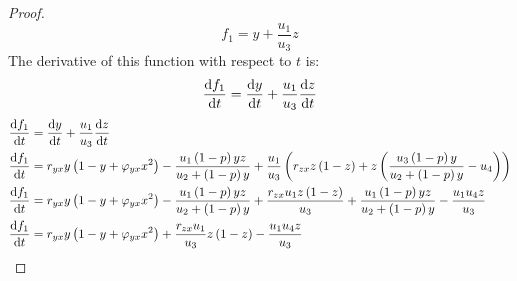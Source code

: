\begin{proof}
    \begin{equation*}
        f_1 = y + \frac{u_1}{u_3}z
    \end{equation*}
    The derivative of this function with respect to $t$ is:
    \begin{equation*}
        \diff[]{f_1}{t} = \diff[]{y}{t} + \frac{u_1}{u_3}\diff[]{z}{t}
    \end{equation*}
    \begin{align*}
        \diff[]{f_1}{t} &= \diff[]{y}{t} + \frac{u_1}{u_3}\diff[]{z}{t}\\
        \diff[]{f_1}{t} &= r_{yx}y\left(1-y+\varphi_{yx}x^2\right)-\frac{u_1\left(1-p\right)yz}{u_2+\left(1-p\right)y}+\frac{u_1}{u_3}\left(r_{zx}z\left(1-z\right)+z\left(\frac{u_3\left(1-p\right)y}{u_2+\left(1-p\right)y}-u_4\right)\right)\\
        \diff[]{f_1}{t} &= r_{yx}y\left(1-y+\varphi_{yx}x^2\right)-\frac{u_1\left(1-p\right)yz}{u_2+\left(1-p\right)y}+\frac{r_{zx}u_1z\left(1-z\right)}{u_3}+\frac{u_1\left(1-p\right)yz}{u_2+\left(1-p\right)y}-\frac{u_1u_4z}{u_3}\\
        \diff[]{f_1}{t} &= r_{yx}y\left(1-y+\varphi_{yx}x^2\right)+\frac{r_{zx}u_1}{u_3}z\left(1-z\right)-\frac{u_1u_4z}{u_3}
    \end{align*}
\end{proof}